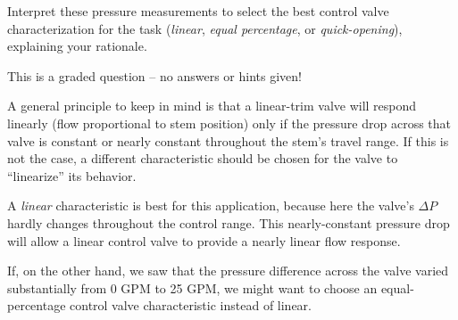 Interpret these pressure measurements to select the best control valve characterization for the task ({\it linear}, {\it equal percentage}, or {\it quick-opening}), explaining your rationale.

\vfil 

\eject






This is a graded question -- no answers or hints given!







A general principle to keep in mind is that a linear-trim valve will respond linearly (flow proportional to stem position) only if the pressure drop across that valve is constant or nearly constant throughout the stem's travel range.  If this is not the case, a different characteristic should be chosen for the valve to ``linearize'' its behavior.

\vskip 10pt

A {\it linear} characteristic is best for this application, because here the valve's $\Delta P$ hardly changes throughout the control range.  This nearly-constant pressure drop will allow a linear control valve to provide a nearly linear flow response.

If, on the other hand, we saw that the pressure difference across the valve varied substantially from 0 GPM to 25 GPM, we might want to choose an equal-percentage control valve characteristic instead of linear.




